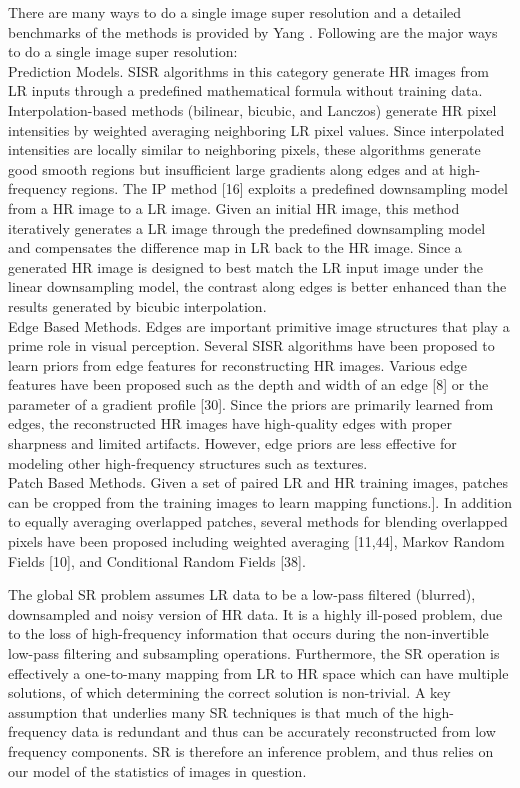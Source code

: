 There are many ways to do a single image super resolution and a detailed benchmarks of the methods is provided by Yang \citet{Yang2014SingleImageSA}. Following are the major ways to do a single image super resolution:\\
Prediction Models. SISR algorithms in this category generate HR images
from LR inputs through a predefined mathematical formula without training
data. Interpolation-based methods (bilinear, bicubic, and Lanczos) generate HR pixel intensities by weighted averaging neighboring LR pixel values. Since interpolated intensities are locally similar to neighboring pixels, these algorithms generate good smooth regions but insufficient large gradients along edges and at high-frequency regions. The IP method [16] exploits a predefined downsampling model from a HR image to a LR image. Given an initial HR image, this method iteratively generates a LR image through the predefined downsampling model and compensates the difference map in LR back to the HR image. Since a generated HR image is designed to best match the LR input image under the linear downsampling model, the contrast along edges is better enhanced than the results generated by bicubic interpolation.\\

Edge Based Methods. Edges are important primitive image structures that
play a prime role in visual perception. Several SISR algorithms have been proposed to learn priors from edge features for reconstructing HR images. Various edge features have been proposed such as the depth and width of an edge [8] or the parameter of a gradient profile [30]. Since the priors are primarily learned from edges, the reconstructed HR images have high-quality edges with proper sharpness and limited artifacts. However, edge priors are less effective for modeling other high-frequency structures such as textures.\\

Patch Based Methods. Given a set of paired LR and HR training images,
patches can be cropped from the training images to learn mapping functions.]. In addition to equally averaging overlapped patches, several methods for blending overlapped pixels have been proposed including weighted averaging [11,44], Markov Random Fields [10], and Conditional Random Fields [38].



The global \ac{SR} problem assumes \ac{LR} data to be a low-pass filtered (blurred), downsampled and noisy version of \ac{HR} data. It is a highly ill-posed problem, due to the loss of high-frequency information that occurs during the non-invertible low-pass filtering and subsampling operations. Furthermore, the SR operation is effectively a one-to-many mapping from \ac{LR} to \ac{HR} space which can have multiple solutions, of which determining the correct solution is non-trivial. A key assumption that underlies many \ac{SR} techniques is that much of the high-frequency data is redundant and thus can be accurately reconstructed from low frequency components. \ac{SR} is therefore an inference problem, and thus relies on our model of the statistics of images in question.


